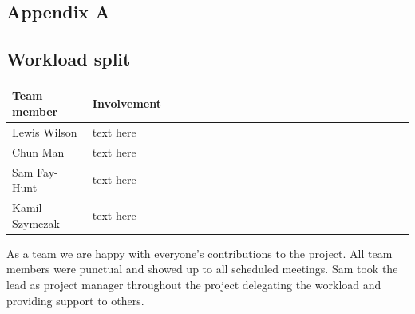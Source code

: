 \documentclass[11pt]{article}
\begin{document}
\pagebreak
\appendix
\appendixpage
\addappheadtotoc
\begin{appendices}

\section{Appendix A}


\subsection{Workload split}
  
  \begin{table}[ht]
    \centering
    \begin{tabular}{|p{0.2\linewidth} | p{0.8\linewidth}|} 
      \hline
      \textbf{Team member}  & \textbf{Involvement} \\ \hline
      Lewis Wilson & text here \\ \hline
      Chun Man & text here  \\ \hline
      Sam Fay-Hunt & text here \\ \hline
      Kamil Szymczak & text here \\ \hline
    \end{tabular}
  \end{table}\label{ContributionTab}

As a team we are happy with everyone's contributions to the project. All team members were punctual and showed up to all scheduled meetings. Sam took the lead as project manager throughout the project delegating the workload and providing support to others.











\end{appendices}
\end{document}
